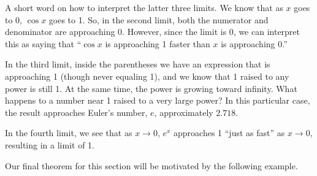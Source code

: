 A short word on how to interpret the latter three limits. We know that as $x$ goes to 0, $\cos x$ goes to 1. So, in the second limit, both the numerator and denominator are approaching 0. However, since the limit is 0, we can interpret this as saying that ``$\cos x$ is approaching 1 faster than $x$ is approaching 0.''

In the third limit, inside the parentheses we have an expression that is approaching 1 (though never equaling 1), and we know that 1 raised to any power is still 1. At the same time, the power is growing toward infinity. What happens to a number near 1 raised to a very large power? In this particular case, the result approaches Euler's number, $e$, approximately $2.718$.

In the fourth limit, we see that as $x\to 0$, $e^x$ approaches 1 ``just as fast'' as $x\to 0$, resulting in a limit of 1.

Our final theorem for this section will be motivated by the following example.

